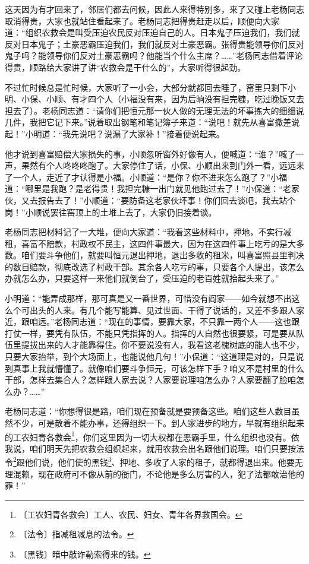 \documentclass[12pt,UTF-8,openany]{ctexbook}
\begin{document}
\begin{normalsize}
    这天因为有才回来了，邻居们都去问候，因此人来得特别多，来了又碰上老杨同志取消得贵，大家也就站住看起来了。老杨同志把得贵赶走以后，顺便向大家道：“组织农救会是叫受压迫农民反对压迫自己的人。日本鬼子压迫我们，我们就反对日本鬼子；土豪恶霸压迫我们，我们就反对土豪恶霸。张得贵能领导你们反对鬼子吗？能领导你们反对土豪恶霸吗？他能当个什么主席？……”老杨同志借着评论得贵，顺路给大家讲了讲“农救会是干什么的”，大家听得很起劲。
    
    不过忙时候总是忙时候，大家听了一小会，大部分就都回去睡了，窑里只剩下小明、小保、小顺、有才四个人（小福没有来，因为后晌没有担完糠，吃过晚饭又去担去了）。老杨同志道：“请你们把恒元那一伙人做的无理无法的坏事拣大的细细说几件，我把它记下来。”说着取出钢笔和笔记簿子来道：“说吧！就先从喜富撤差说起！”小明道：“我先说吧？说漏了大家补！”接着便说起来。
    
    他才说到喜富赔偿大家损失的事，小顺忽听窗外好像有人，便喊道：“谁？”喊了一声，果然有个人咚咚咚跑了。大家停住了话，小保、小顺出来到门外一看，远远来了一个人，走近了才认得是小福。小顺道：“是你？你不进来怎么跑了？”小福道：“哪里是我跑？是老得贵！我担完糠一出门就见他跑过去了！”小保道：“老家伙，又去报告去了！”小顺道：“要防备这老家伙坏事！你们回去谈吧，我去站个岗！”小顺说罢往窑顶上的土堆上去了，大家仍旧接着谈。
    
    老杨同志把材料记了一大堆，便向大家道：“我看这些材料中，押地，不实行减租，喜富不赔款，村政权不民主，这四件事最大，因为在这四件事上吃亏的是大多数。咱们要斗争他们，就要叫恒元退出押地，退出多收的租米，叫喜富照县里判决的数目赔款，彻底改选了村政干部。其余各人吃亏的事，只要各个人提出，该怎么办就怎么办，只要这样一来他们就倒台了，受压迫的老百姓就抬起头来了。”
    
    小明道：“能弄成那样，那可真是又一番世界，可惜没有阎家——如今就想不出这么个可出头的人来。有几个能写能算、见过世面、干得了说话的，又差不多跟人家近，跟咱远。”老杨同志道：“现在的事情，要靠大家，不只靠一两个人——这也跟打仗一样，要凭有队伍，不能只凭指挥的人。指挥的人自然也很要紧，可是要从队伍里提拔出来的人才能靠得住。你不要说没有人，我看这老槐树底的能人也不少，只要大家抬举，到个大场面上，也能说他几句！”小保道：“这道理是对的，只是说到真事上我就懵懂了。就像咱们要斗争恒元，可该怎样下手？咱又不是村里的什么干部，怎样去集合人？怎样跟人家去说？人家要说理咱怎么办？人家要翻了脸咱怎么办？……”
    
    老杨同志道：“你想得很是路，咱们现在预备就是要预备这些。咱们这些人数目虽然不少，可是散着不能办事，还得组织一下。到人家进步的地方，早就有组织起来的工农妇青各救会\footnote{〔工农妇青各救会〕工人、农民、妇女、青年各界救国会。}，你们这里因为一切大权都在恶霸手里，什么组织也没有。依我说，咱们明天先把农救会组织起来，就用农救会出名跟他们说理。咱们只要按法令\footnote{〔法令〕指减租减息的法令。}跟他们说，他们使的黑钱\footnote{〔黑钱〕暗中敲诈勒索得来的钱。}、押地、多收了人家的租子，就都得退出来。他要无理混赖，现在政府可不像从前的衙门，不论他是多么厉害的人，犯了法都敢治他的罪！”
    

\end{normalsize}
\end{document}
